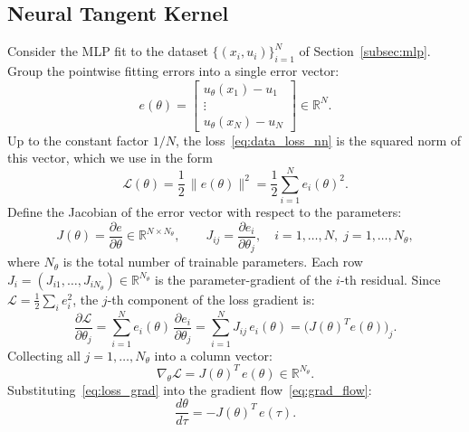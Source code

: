 \subsection{Neural Tangent Kernel}
\label{subsec:ntk}

Consider the MLP fit to the dataset $\{(x_i,u_i)\}_{i=1}^{N}$ of Section~\ref{subsec:mlp}. Group the pointwise fitting errors into a single error vector:
\begin{equation}\label{eq:error_vector}
    e(\theta) =
    \begin{bmatrix}
        u_\theta(x_1) - u_1 \\
        \vdots \\
        u_\theta(x_{N}) - u_{N}
    \end{bmatrix}
    \in \mathbb{R}^{N}.
\end{equation}
Up to the constant factor $1/N$, the loss~\eqref{eq:data_loss_nn} is the squared norm of this vector, which we use in the form
\begin{equation}\label{eq:loss_quadratic}
    \mathcal{L}(\theta) = \frac{1}{2}\,\|e(\theta)\|^2 = \frac{1}{2}\sum_{i=1}^{N} e_i(\theta)^2.
\end{equation}
Define the Jacobian of the error vector with respect to the parameters:
\begin{equation}\label{eq:jacobian}
    J(\theta) = \frac{\partial e}{\partial\theta} \in \mathbb{R}^{N \times N_\theta},
    \qquad J_{ij} = \frac{\partial e_i}{\partial\theta_j},\quad i = 1,\ldots,N,\; j = 1,\ldots,N_\theta,
\end{equation}
where $N_\theta$ is the total number of trainable parameters. Each row $J_i = (J_{i1},\ldots,J_{iN_\theta}) \in \mathbb{R}^{N_\theta}$ is the parameter-gradient of the $i$-th residual. Since $\mathcal{L} = \tfrac{1}{2}\sum_i e_i^2$, the $j$-th component of the loss gradient is:
\begin{equation}
    \frac{\partial \mathcal{L}}{\partial \theta_j}
    = \sum_{i=1}^{N} e_i(\theta)\,\frac{\partial e_i}{\partial \theta_j}
    = \sum_{i=1}^{N} J_{ij}\,e_i(\theta)
    = \bigl(J(\theta)^T e(\theta)\bigr)_j.
\end{equation}
Collecting all $j = 1,\ldots,N_\theta$ into a column vector:
\begin{equation}\label{eq:loss_grad}
    \nabla_\theta\mathcal{L} = J(\theta)^T\,e(\theta) \in \mathbb{R}^{N_\theta}.
\end{equation}
Substituting~\eqref{eq:loss_grad} into the gradient flow~\eqref{eq:grad_flow}:
\begin{equation}\label{eq:param_dynamics}
    \frac{d\theta}{d\tau} = -J(\theta)^T\,e(\tau).
\end{equation}
